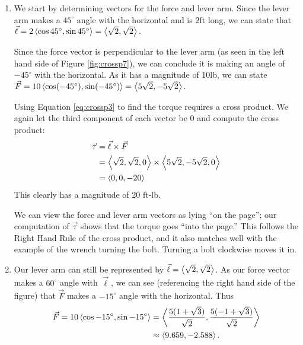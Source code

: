 {\begin{enumerate}
	\item We start by determining vectors for the force and lever arm. Since the lever arm makes a $45^\circ$ angle with the horizontal and is 2ft long, we can state that $\vec \ell = 2\left\langle \cos 45^\circ,\sin 45^\circ\right\rangle = \left\langle \sqrt2,\sqrt2\right\rangle.$
	
	Since the force vector is perpendicular to the lever arm (as seen in the left hand side of Figure \ref{fig:crossp7}), we can conclude it is making an angle of $-45^\circ$ with the horizontal. As it has a magnitude of 10lb, we can state $\vec F = 10\left\langle \cos (-45^\circ), \sin(-45^\circ)\right\rangle = \left\langle 5\sqrt2,-5\sqrt2\right\rangle.$
	
	Using Equation \eqref{eq:crossp3} to find the torque requires a cross product. We again let the third component of each vector be 0  and compute the cross product:
	\begin{align*}
	\vec\tau &= \vec \ell \times \vec F \\
				&= \left\langle \sqrt2,\sqrt2,0\right\rangle \times \left\langle 5\sqrt2,-5\sqrt2,0\right\rangle \\
				&= \left\langle 0,0,-20\right\rangle
	\end{align*}
	This clearly has a magnitude of 20 ft-lb.
	
	We can view the force and lever arm vectors as lying ``on the page''; our computation of $\vec\tau$ shows that the torque goes ``into the page.'' This follows the Right Hand Rule of the cross product, and it also matches well with the example of the wrench turning the bolt. Turning a bolt clockwise moves it in.
	
	\item		Our lever arm can still be represented by $\vec \ell = \left\langle \sqrt2,\sqrt2\right\rangle$. As our force vector makes a $60^\circ$ angle with $\vec \ell$, we can see (referencing the right hand side of the figure) that $\vec F$ makes a $-15^\circ$ angle with the horizontal. Thus 
	\begin{align*}
	\vec F = 10\left\langle \cos-15^\circ,\sin-15^\circ\right\rangle &= \left\langle \frac{5(1+\sqrt3)}{\sqrt2},\frac{5(-1+\sqrt3)}{\sqrt2}\right\rangle \\
	&\approx \left\langle 9.659,-2.588\right\rangle.\end{align*}
	

\end{enumerate}}
